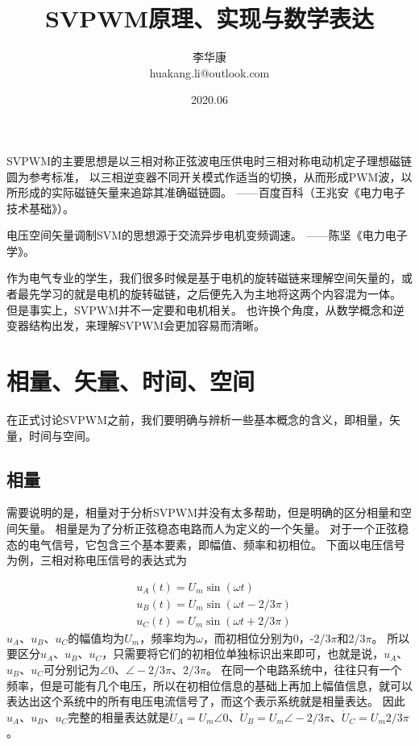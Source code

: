 \documentclass{ctexart}
\numberwithin{equation}{section}
\begin{document}
\title{\heiti SVPWM原理、实现与数学表达}    
\author{\kaishu 李华康 \\huakang.li@outlook.com}  
\date{2020.06}
\maketitle


\doclicenseThis
\vspace{20pt}

SVPWM的主要思想是以三相对称正弦波电压供电时三相对称电动机定子理想磁链圆为参考标准，
以三相逆变器不同开关模式作适当的切换，从而形成PWM波，以所形成的实际磁链矢量来追踪其准确磁链圆。
——百度百科（王兆安《电力电子技术基础》）。

电压空间矢量调制SVM的思想源于交流异步电机变频调速。
——陈坚《电力电子学》。

作为电气专业的学生，我们很多时候是基于电机的旋转磁链来理解空间矢量的，或者最先学习的就是电机的旋转磁链，之后便先入为主地将这两个内容混为一体。
但是事实上，SVPWM并不一定要和电机相关。
也许换个角度，从数学概念和逆变器结构出发，来理解SVPWM会更加容易而清晰。

\section{相量、矢量、时间、空间}
在正式讨论SVPWM之前，我们要明确与辨析一些基本概念的含义，即相量，矢量，时间与空间。

\subsection{相量}
需要说明的是，相量对于分析SVPWM并没有太多帮助，但是明确的区分相量和空间矢量。
相量是为了分析正弦稳态电路而人为定义的一个矢量。
对于一个正弦稳态的电气信号，它包含三个基本要素，即幅值、频率和初相位。
下面以电压信号为例，三相对称电压信号的表达式为

\begin{equation}
  \begin{aligned}
  	&u_A(t) = U_m \sin (\omega t)\\
  	&u_B(t) = U_m \sin (\omega t - 2/3\pi)\\
  	&u_C(t) = U_m \sin (\omega t + 2/3\pi)
  \end{aligned}
\end{equation}
$ u_A $、$ u_B $、$ u_C $的幅值均为$ U_m $，频率均为$ \omega $，而初相位分别为0，-2/3$ \pi $和2/3$ \pi $。
所以要区分$ u_A $、$ u_B $、$ u_C $，只需要将它们的初相位单独标识出来即可，也就是说，$ u_A $、$ u_B $、$ u_C $可分别记为$ \angle 0 $、$ \angle -2/3\pi $、$ 2/3\pi $。
在同一个电路系统中，往往只有一个频率，但是可能有几个电压，所以在初相位信息的基础上再加上幅值信息，就可以表达出这个系统中的所有电压电流信号了，而这个表示系统就是相量表达。
因此$ u_A $、$ u_B $、$ u_C $完整的相量表达就是$ \dot U_A = U_m\angle 0 $、$ \dot U_B = U_m\angle -2/3\pi $、$\dot U_C = U_m2/3\pi $。
\end{document}
